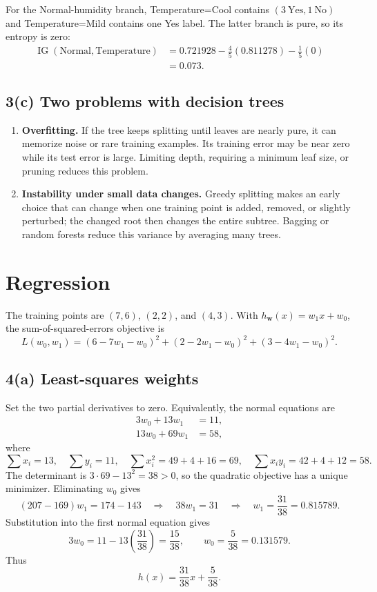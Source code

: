 \documentclass[11pt]{article}
\newcommand{\IG}{\operatorname{IG}}
\begin{document}
For the Normal-humidity branch, Temperature=Cool contains $(3\ \mathrm{Yes},1\ \mathrm{No})$
and Temperature=Mild contains one Yes label.  The latter branch is pure, so its
entropy is zero:
\begin{align*}
\IG(\mathrm{Normal},\mathrm{Temperature})
&=0.721928-\tfrac45(0.811278)-\tfrac15(0)\\
&=\boxed{0.073}.
\end{align*}

\subsection*{3(c) Two problems with decision trees}
\begin{enumerate}[label=\arabic*.]
    \item \textbf{Overfitting.} If the tree keeps splitting until leaves are
    nearly pure, it can memorize noise or rare training examples.  Its training
    error may be near zero while its test error is large.  Limiting depth,
    requiring a minimum leaf size, or pruning reduces this problem.
    \item \textbf{Instability under small data changes.} Greedy splitting makes
    an early choice that can change when one training point is added, removed,
    or slightly perturbed; the changed root then changes the entire subtree.
    Bagging or random forests reduce this variance by averaging many trees.
\end{enumerate}

\section{Regression}

The training points are $(7,6)$, $(2,2)$, and $(4,3)$.  With
$h_{\mathbf w}(x)=w_1x+w_0$, the sum-of-squared-errors objective is
\[
L(w_0,w_1)=(6-7w_1-w_0)^2+(2-2w_1-w_0)^2+(3-4w_1-w_0)^2.
\]

\subsection*{4(a) Least-squares weights}
Set the two partial derivatives to zero.  Equivalently, the normal equations are
\begin{align*}
3w_0+13w_1&=11,\\
13w_0+69w_1&=58,
\end{align*}
where
\[
\sum x_i=13,\quad \sum y_i=11,\quad
\sum x_i^2=49+4+16=69,\quad
\sum x_iy_i=42+4+12=58.
\]
The determinant is $3\cdot69-13^2=38>0$, so the quadratic objective has a
unique minimizer.  Eliminating $w_0$ gives
\[
(207-169)w_1=174-143
\quad\Longrightarrow\quad
38w_1=31
\quad\Longrightarrow\quad
w_1=\frac{31}{38}=0.815789.
\]
Substitution into the first normal equation gives
\[
3w_0=11-13\left(\frac{31}{38}\right)=\frac{15}{38},
\qquad
w_0=\frac{5}{38}=0.131579.
\]
Thus
\[
\boxed{h(x)=\frac{31}{38}x+\frac{5}{38}}.
\]
\end{document}
